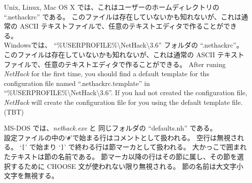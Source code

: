 Unix, Linux, Mac OS X では、これはユーザーのホームディレクトリの
\mbox{``.nethackrc''} である。
このファイルは存在していないかも知れないが、これは通常の
ASCII テキストファイルで、任意のテキストエディタで作ることができる。\\

Windowsでは、
\mbox{{``\%USERPROFILE\%\textbackslash NetHack\textbackslash 3.6''}} フォルダの
\mbox{``.nethackrc''}。
このファイルは存在していないかも知れないが、これは通常の
ASCII テキストファイルで、任意のテキストエディタで作ることができる。
After runing {\it NetHack\/} for the first time, you should find a default
template for ths configuration file named \mbox{``.nethackrc.template''} in
\mbox{{``\%USERPROFILE\%\textbackslash NetHack\textbackslash 3.6''}}.
If you had not created the configuration file, {\it NetHack\/} will create
the configuration file for you using the default template file.
(TBT)

MS-DOS では、\mbox{{\it nethack.exe\/}} と
同じフォルダの \mbox{``defaults.nh''} である。\\

設定ファイルの中の`{\tt \#}'で始まる行はコメントとして扱われる。
空行は無視される。
`{\tt [}' で始まり `{\tt ]}' で終わる行は節マーカとして扱われる。
大かっこで囲まれたテキストは節の名前である。
節マーカ以降の行はその節に属し、その節を選択するために
CHOOSE 文が使われない限り無視される。
節の名前は大文字小文字を無視する。

